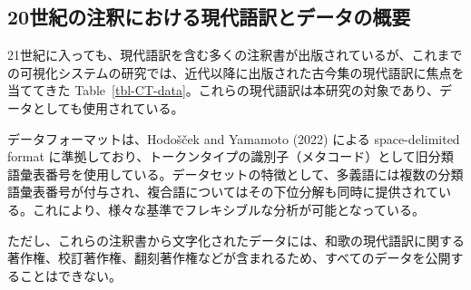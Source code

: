 \documentclass[
  letterpaper,
  DIV=11,
  numbers=noendperiod]{scrartcl}
\begin{document}
\subsection{20世紀の注釈における現代語訳とデータの概要}\label{ux4e16ux7d00ux306eux6ce8ux91c8ux306bux304aux3051ux308bux73feux4ee3ux8a9eux8a33ux3068ux30c7ux30fcux30bfux306eux6982ux8981}

21世紀に入っても、現代語訳を含む多くの注釈書が出版されているが、これまでの可視化システムの研究では、近代以降に出版された古今集の現代語訳に焦点を当ててきた
Table~\ref{tbl-CT-data}。これらの現代語訳は本研究の対象であり、データとしても使用されている。

データフォーマットは、Hodošček and Yamamoto (2022) による
space-delimited format
に準拠しており、トークンタイプの識別子（メタコード）として旧分類語彙表番号を使用している。データセットの特徴として、多義語には複数の分類語彙表番号が付与され、複合語についてはその下位分解も同時に提供されている。これにより、様々な基準でフレキシブルな分析が可能となっている。

ただし、これらの注釈書から文字化されたデータには、和歌の現代語訳に関する著作権、校訂著作権、翻刻著作権などが含まれるため、すべてのデータを公開することはできない。
\end{document}
